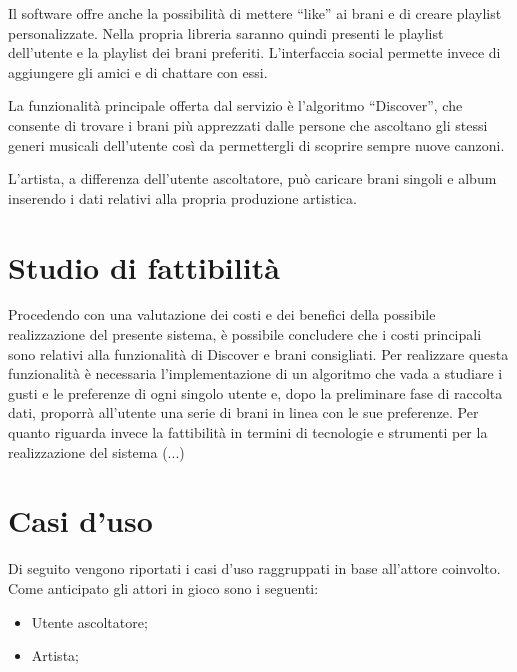 Il software offre anche la possibilità di mettere ``like'' ai brani e di creare playlist
personalizzate. Nella propria libreria saranno quindi presenti le playlist dell'utente e
la playlist dei brani preferiti. L'interfaccia social permette invece di aggiungere gli
amici e di chattare con essi.

La funzionalità principale offerta dal servizio è l'algoritmo ``Discover'', che consente
di trovare i brani più apprezzati dalle persone che ascoltano gli stessi generi musicali
dell'utente così da permettergli di scoprire sempre nuove canzoni.

L'artista, a differenza dell'utente ascoltatore, può caricare brani singoli e album
inserendo i dati relativi alla propria produzione artistica.

\section{Studio di fattibilità}
Procedendo con una valutazione dei costi e dei benefici della possibile realizzazione del
presente sistema, è possibile concludere che i costi principali sono relativi alla
funzionalità di Discover e brani consigliati. Per realizzare questa funzionalità è
necessaria l'implementazione di un algoritmo che vada a studiare i gusti e le preferenze
di ogni singolo utente e, dopo la preliminare fase di raccolta dati, proporrà all'utente
una serie di brani in linea con le sue preferenze. Per quanto riguarda invece la
fattibilità in termini di tecnologie e strumenti per la realizzazione del sistema (...)

\section{Casi d'uso}
Di seguito vengono riportati i casi d'uso raggruppati in base all'attore coinvolto. Come
anticipato gli attori in gioco sono i seguenti:
\begin{itemize}
      \item Utente ascoltatore;
      \item Artista;
\end{itemize}

